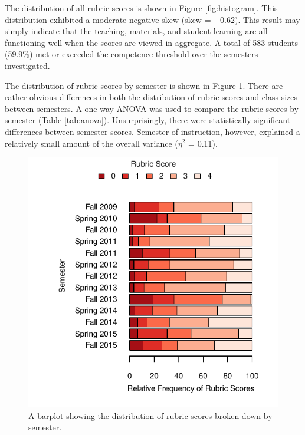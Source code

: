 \documentclass[fleqn,10pt]{SelfArx}\usepackage[]{graphicx}\usepackage[]{color}
\begin{document}
The distribution of all rubric scores is shown in Figure \ref{fig:histogram}. This distribution exhibited a moderate negative skew (skew = \ensuremath{-0.62}). This result may simply indicate that the teaching, materials, and student learning are all functioning well when the scores are viewed in aggregate. A total of 583 students (59.9\%) met or exceeded the competence threshold over the semesters investigated.

The distribution of rubric scores by semester is shown in Figure \ref{fig:barplot}. There are rather obvious differences in both the distribution of rubric scores and class sizes between semesters. A one-way ANOVA was used to compare the rubric scores by semester (Table \ref{tab:anova}). Unsurprisingly, there were statistically significant differences between semester scores. Semester of instruction, however, explained a relatively small amount of the overall variance ($\eta^2$ = 0.11).

\begin{figure}[h]\centering

\includegraphics[width=\columnwidth,viewport = 30 0 288 288]{./figure/barplot}
\protect\caption{A barplot showing the distribution of rubric scores broken down by semester.}
\label{fig:barplot}
\end{figure}
\end{document}
